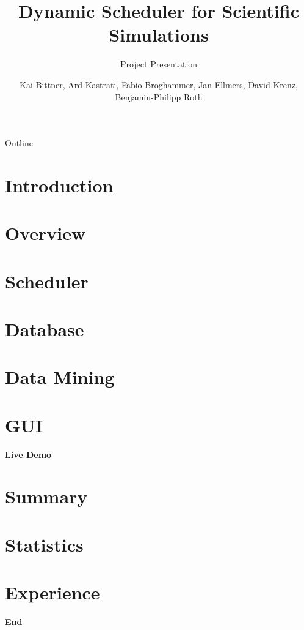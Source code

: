 \documentclass[18pt]{beamer}
\title[Project Presentation]{Dynamic Scheduler for Scientific Simulations}
\subtitle{Project Presentation}
\author{Kai Bittner, Ard Kastrati, Fabio Broghammer, Jan Ellmers, David Krenz, Benjamin-Philipp Roth}
\institute{Steinbuch Centre for Computing - SCC}
\begin{document}

\begin{frame}
\titlepage
\end{frame}




\begin{frame}{Outline}
\tableofcontents
\end{frame}

\section{Introduction}

\section{Overview}

\section{Scheduler}

\section{Database}



\section{Data Mining}


\section{GUI}


\begin{frame}
	\begin{center}
			\huge{\textbf{Live Demo}}
	\end{center}		
\end{frame}

\section{Summary}

\section{Statistics}

\section{Experience}

\begin{frame}
	\begin{center}
			\huge{\textbf{End}}
	\end{center}		
\end{frame}
\end{document}
